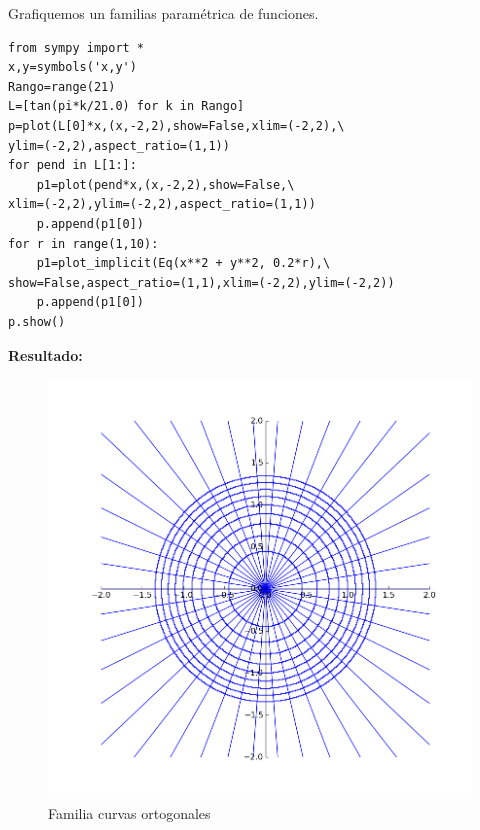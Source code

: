 \begin{ejemplo}Grafiquemos un familias paramétrica de funciones.

\end{ejemplo}



\begin{lstlisting}
from sympy import *
x,y=symbols('x,y')
Rango=range(21)
L=[tan(pi*k/21.0) for k in Rango] 
p=plot(L[0]*x,(x,-2,2),show=False,xlim=(-2,2),\
ylim=(-2,2),aspect_ratio=(1,1))
for pend in L[1:]:
    p1=plot(pend*x,(x,-2,2),show=False,\
xlim=(-2,2),ylim=(-2,2),aspect_ratio=(1,1))
    p.append(p1[0])
for r in range(1,10):
    p1=plot_implicit(Eq(x**2 + y**2, 0.2*r),\
show=False,aspect_ratio=(1,1),xlim=(-2,2),ylim=(-2,2))
    p.append(p1[0])
p.show()
\end{lstlisting}


\noindent\textbf{Resultado:}
\begin{figure}[h]
\begin{center}
\includegraphics[scale=.2]{imagenes/flia_curvas_ortogonales.png}
\end{center}
\caption{Familia curvas ortogonales}\label{fig:ortogonales}
\end{figure}


